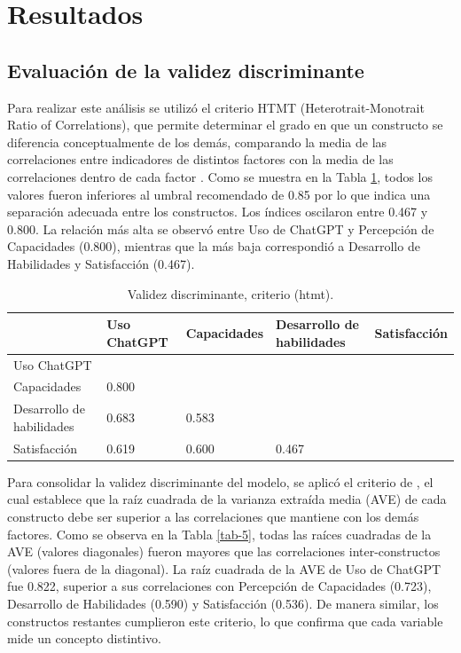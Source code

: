 \documentclass[spanish]{textolivre}
\begin{document}
\section{Resultados}
\subsection{Evaluación de la validez discriminante}
Para realizar este análisis se utilizó el criterio HTMT (Heterotrait-Monotrait Ratio of Correlations), que permite determinar el grado en que un constructo se diferencia conceptualmente de los demás, comparando la media de las correlaciones entre indicadores de distintos factores con la media de las correlaciones dentro de cada factor \cite{roemer2021}. Como se muestra en la Tabla \ref{tab-4}, todos los valores fueron inferiores al umbral recomendado de 0.85 por \textcite{henseler2015} lo que indica una separación adecuada entre los constructos. Los índices oscilaron entre 0.467 y 0.800. La relación más alta se observó entre Uso de ChatGPT y Percepción de Capacidades (0.800), mientras que la más baja correspondió a Desarrollo de Habilidades y Satisfacción (0.467).

\begin{table}[h!]
\centering
\small
\begin{threeparttable}
\caption{Validez discriminante, criterio (htmt).}\label{tab-4}
\begin{tabular}{p{3.5cm} p{2cm} p{2cm} p{3.5cm} p{1.5cm}}
\toprule
 & Uso ChatGPT & Capacidades & Desarrollo de habilidades & Satisfacción \\
\midrule
Uso ChatGPT \\
Capacidades & 0.800 \\
Desarrollo de habilidades & 0.683 & 0.583 \\
Satisfacción & 0.619 & 0.600 & 0.467 \\
\bottomrule
\end{tabular}
\end{threeparttable}
\end{table}

Para consolidar la validez discriminante del modelo, se aplicó el criterio de \textcite{fornell1981}, el cual establece que la raíz cuadrada de la varianza extraída media (AVE) de cada constructo debe ser superior a las correlaciones que mantiene con los demás factores. Como se observa en la Tabla \ref{tab-5}, todas las raíces cuadradas de la AVE (valores diagonales) fueron mayores que las correlaciones inter-constructos (valores fuera de la diagonal). La raíz cuadrada de la AVE de Uso de ChatGPT fue 0.822, superior a sus correlaciones con Percepción de Capacidades (0.723), Desarrollo de Habilidades (0.590) y Satisfacción (0.536). De manera similar, los constructos restantes cumplieron este criterio, lo que confirma que cada variable mide un concepto distintivo. 
\end{document}
